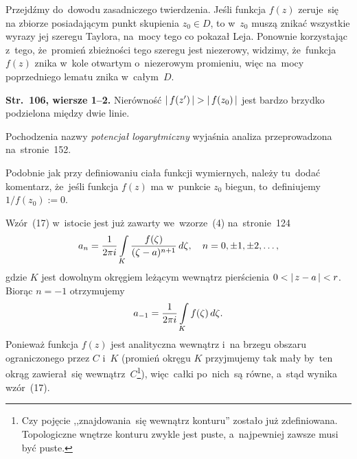 \documentclass[a4paper,11pt]{article}
\begin{document}
Przejdźmy do~dowodu zasadniczego twierdzenia. Jeśli funkcja $f( z )$
zeruje~się na zbiorze posiadającym punkt skupienia $z_{ 0 } \in D$, to
w~$z_{ 0 }$ muszą znikać wszystkie wyrazy jej szeregu Taylora, na~mocy
tego co pokazał Leja. Ponownie korzystając z~tego, że~promień
zbieżności tego szeregu jest niezerowy, widzimy, że~funkcja~$f( z )$
znika w~kole otwartym o~niezerowym promieniu, więc na~mocy
poprzedniego lematu znika w~całym~$D$.

\vspace{\spaceFour}


\start \textbf{Str.~106, wiersze 1--2.} Nierówność
$\left| \,  f( z' )  \, \right| > \left| \,  f( z_{ 0 } )  \, \right|$ jest bardzo brzydko
podzielona między dwie linie.

\vspace{\spaceFour}


\start {} Pochodzenia nazwy \emph{potencjał logarytmiczny}
wyjaśnia analiza przeprowadzona na~stronie~152.

\vspace{\spaceFour}


\start {} Podobnie jak przy definiowaniu ciała funkcji
wymiernych, należy tu~dodać komentarz, że~jeśli funkcja $f( z )$ ma
w~punkcie $z_{ 0 }$ biegun, to~definiujemy $1 / f( z_{ 0 } ) := 0$.

\vspace{\spaceFour}


\start {} Wzór~(17) w~istocie jest już zawarty we~wzorze~(4)
na~stronie~124
\begin{equation}
  \label{eq:Leja-46}
  a_{ n } = \frac{ 1 }{ 2\pi i }
  \int\limits_{ K } \frac{ f( \zeta ) }{ ( \zeta - a )^{ n + 1 } } \, d\zeta,
  \quad n = 0, \pm 1, \pm 2, \ldots,
\end{equation}
gdzie $K$ jest dowolnym okręgiem leżącym wewnątrz pierścienia
$0 < \left| \,  z - a  \, \right| < r$. Biorąc $n = -1$ otrzymujemy
\begin{equation}
  \label{eq:Leja-47}
  a_{ -1 } = \frac{ 1 }{ 2\pi i } \int\limits_{ K } f( \zeta )\, d\zeta.
\end{equation}
Ponieważ funkcja $f( z )$ jest analityczna wewnątrz i~na brzegu
obszaru ograniczonego przez $C$ i~$K$ (promień okręgu $K$ przyjmujemy
tak mały by~ten okrąg zawierał~się wewnątrz~$C$\footnote{Czy pojęcie
  ,,znajdowania~się wewnątrz konturu'' zostało już zdefiniowana.
  Topologiczne wnętrze konturu zwykle jest puste, a~najpewniej zawsze
  musi być puste.}), więc~całki po~nich~są równe, a~stąd wynika
wzór~(17).

\vspace{\spaceFour}
\end{document}
